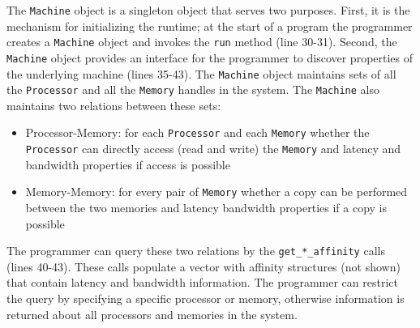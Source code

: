 The {\tt Machine} object is a singleton object that serves two purposes.  First, it
is the mechanism for initializing the runtime; at the start of a program the programmer
creates a {\tt Machine} object and invokes the {\tt run} method (line 30-31).
Second, the {\tt Machine} object provides an interface for the programmer to 
discover properties of the underlying machine (lines 35-43).  The {\tt Machine} object maintains
sets of all the {\tt Processor} and all the {\tt Memory} handles in the system.
The {\tt Machine} also maintains two relations between these sets:

\begin{itemize}
\item Processor-Memory: for each {\tt Processor} and each {\tt Memory} whether
the {\tt Processor} can directly access (read and write) the {\tt Memory} and 
latency and bandwidth properties if access is possible
\item Memory-Memory: for every pair of {\tt Memory} whether a copy can be
performed between the two memories and latency 
bandwidth properties if a copy is possible
\end{itemize}

The programmer can query these two relations by the {\tt get\_*\_affinity} calls
(lines 40-43).  These calls populate a vector with affinity structures (not shown)
that contain latency and bandwidth information.  The programmer can restrict the query
by specifying a specific processor or memory, otherwise information is returned
about all processors and memories in the system.  

